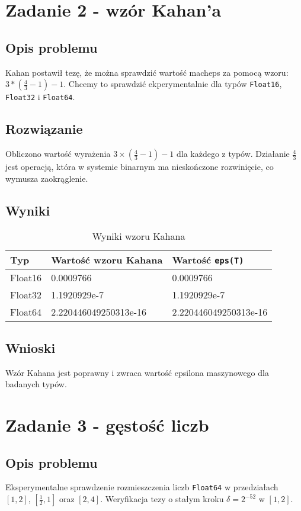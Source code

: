 \documentclass{article}
\begin{document}
\section{Zadanie 2 - wzór Kahan'a}
\subsection{Opis problemu}
Kahan postawił tezę, że można sprawdzić wartość macheps za pomocą wzoru: $3*(\frac{4}{3}-1)-1$. Chcemy to sprawdzić ekperymentalnie dla typów \texttt{Float16}, \texttt{Float32} i \texttt{Float64}.

\subsection{Rozwiązanie}
Obliczono wartość wyrażenia $3 \times (\frac{4}{3}-1)-1$ dla każdego z typów. Działanie $\frac{4}{3}$ jest operacją, która w systemie binarnym ma nieskończone rozwinięcie, co wymusza zaokrąglenie.

\subsection{Wyniki}
\begin{table}[!htbp]
\centering
\caption{Wyniki wzoru Kahana}
\label{tab:kahan}
\begin{tabular}{lll}
\toprule
Typ & Wartość wzoru Kahana & Wartość \texttt{eps(T)} \\
\midrule
Float16 & 0.0009766 & 0.0009766 \\
Float32 & 1.1920929e-7 & 1.1920929e-7 \\
Float64 & 2.220446049250313e-16 & 2.220446049250313e-16 \\
\bottomrule
\end{tabular}
\end{table}

\subsection{Wnioski}
Wzór Kahana jest poprawny i zwraca wartość epsilona maszynowego dla badanych typów.

\section{Zadanie 3 - gęstość liczb}
\subsection{Opis problemu}
Eksperymentalne sprawdzenie rozmieszczenia liczb \texttt{Float64} w przedziałach $[1, 2]$, $[\frac{1}{2}, 1]$ oraz $[2, 4]$. Weryfikacja tezy o stałym kroku $\delta = 2^{-52}$ w $[1, 2]$.
\end{document}
